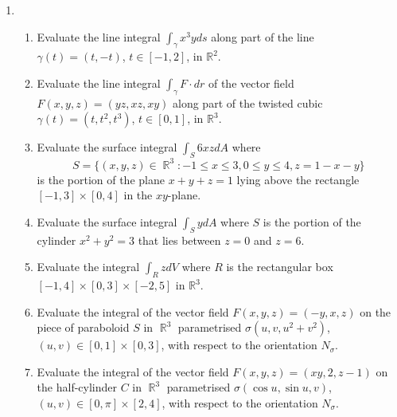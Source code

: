 \documentclass{article}
\DeclareMathOperator{\R}{\mathbb{R}}
\begin{document}
\begin{enumerate}
\item
		\begin{enumerate}
		\item
		Evaluate the line integral $\int_\gamma x^3yds$ along part of the line $\gamma(t) = (t,-t)$, $t \in [-1, 2]$, in $\mathbb{R}^2$.
		
		\item
		Evaluate the line integral $\int_\gamma F \cdot dr$ of the vector field $F(x,y,z) = (yz,xz,xy)$ along part of the twisted cubic $\gamma(t) = (t,t^2,t^3)$, $t \in [0,1]$, in $\mathbb{R}^3$.
		
		\item
		Evaluate the surface integral $\int_S 6xz dA$ where 
		\[ S = \{ (x,y,z) \in \R^3:  -1 \leq x \leq 3, 0 \leq y \leq 4, z=1-x-y \} \] 
		is the portion of the plane $x+y+z = 1$ lying above the rectangle $[-1,3] \times [0,4]$ in the $xy$-plane.
		
		\item
		Evaluate the surface integral $\int_S y dA$ where $S$ is the portion of the cylinder $x^2+y^2 = 3$ that lies between $z=0$ and $z=6$. 
		
		\item
		Evaluate the integral $\int_R z dV$ where $R$ is the rectangular box $[-1,4] \times [0,3] \times [-2,5]$ in $\mathbb{R}^3$.
		
		\item
		Evaluate the integral of the vector field $F(x,y,z) = (-y,x,z)$ on the piece of paraboloid $S$ in $\R^3$ parametrised $\sigma(u, v, u^2+v^2)$, $(u,v) \in [0,1] \times [0,3]$, with respect to the orientation $N_\sigma$.
		
		\item
		Evaluate the integral of the vector field $F(x,y,z) = (xy,2,z-1)$ on the half-cylinder $C$ in $\R^3$ parametrised $\sigma(\cos u, \sin u, v)$, $(u,v) \in [0,\pi] \times [2,4]$, with respect to the orientation $N_\sigma$.		
		\end{enumerate}
\end{enumerate}
\end{document}
